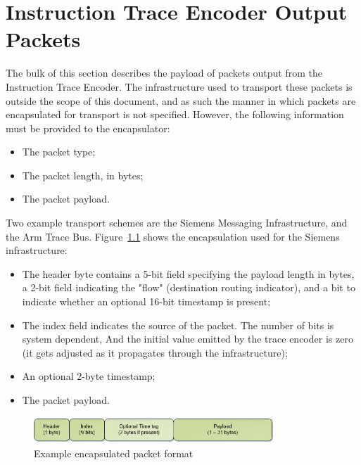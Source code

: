\chapter{Instruction Trace Encoder Output Packets} \label{packets}

The bulk of this section describes the payload of packets output from the Instruction Trace Encoder.
The infrastructure used to transport these packets is outside the scope of this document, and
as such the manner in which packets are encapsulated for transport is not specified.
However, the following information must be provided to the encapsulator:

\begin{itemize}
  \item The packet type;
  \item The packet length, in bytes;
  \item The packet payload.
\end{itemize}

Two example transport schemes are the Siemens Messaging Infrastructure, and the Arm Trace Bus.
Figure~\ref{fig:packet-format} shows the encapsulation used for the Siemens infrastructure:
\begin{itemize}
  \item The header byte contains a 5-bit field specifying the payload length in bytes, a 2-bit
    field indicating the "flow" (destination routing indicator), and a bit to indicate whether
    an optional 16-bit timestamp is present;
  \item The index field indicates the source of the packet.  The number of bits is system dependent,
    And the initial value emitted by the trace encoder is zero (it gets adjusted as it propagates 
    through the infrastructure);
  \item An optional 2-byte timestamp;
  \item The packet payload.
\end{itemize}

\begin{figure}[h]
  \begin{center}
    \includegraphics[height=1cm, width=9cm]{newPacket.jpg}
    \caption{Example encapsulated packet format}
    \label{fig:packet-format}
  \end{center}
\end{figure}



